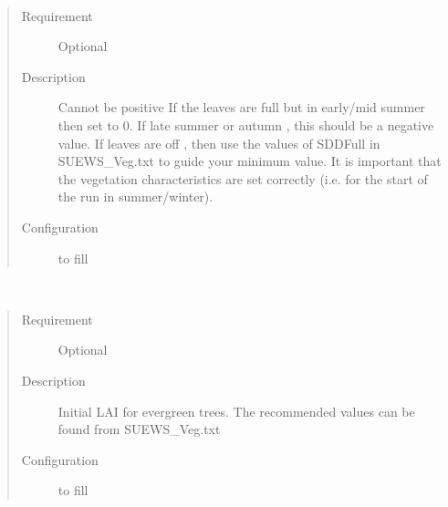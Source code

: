\documentclass[letterpaper,10pt,english]{sphinxmanual}
\begin{document}

\begin{fulllineitems}
\label{\detokenize{input_files/Initial_Conditions/Vegetation_parameters:cmdoption-arg-gdd-2-0}}~\begin{quote}\begin{description}
\item[{Requirement}] \leavevmode
Optional

\item[{Description}] \leavevmode
Cannot be positive If the leaves are full but in early/mid summer then set to 0. If late summer or autumn , this should be a negative value. If leaves are off , then use the values of SDDFull in SUEWS\_Veg.txt to guide your minimum value. It is important that the vegetation characteristics are set correctly (i.e. for the start of the run in summer/winter).

\item[{Configuration}] \leavevmode
to fill

\end{description}\end{quote}

\end{fulllineitems}


\begin{fulllineitems}
\label{\detokenize{input_files/Initial_Conditions/Vegetation_parameters:cmdoption-arg-laiinitialevetr}}~\begin{quote}\begin{description}
\item[{Requirement}] \leavevmode
Optional

\item[{Description}] \leavevmode
Initial LAI for evergreen trees. The recommended values can be found from SUEWS\_Veg.txt

\item[{Configuration}] \leavevmode
to fill

\end{description}\end{quote}

\end{fulllineitems}
\end{document}
